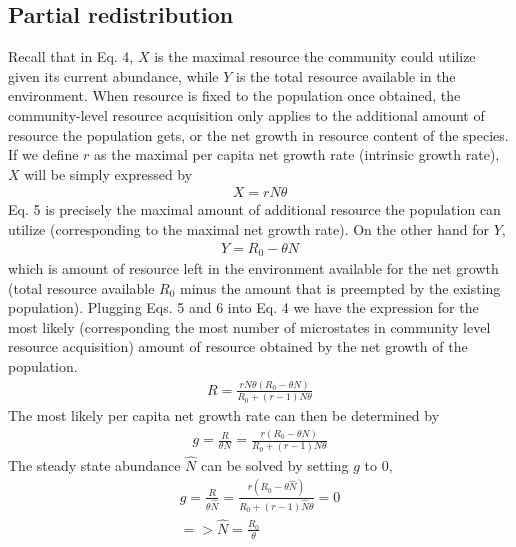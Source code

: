 \documentclass[12pt]{article}
\begin{document}
\subsection{Partial redistribution}
Recall that in Eq. 4, $X$ is the maximal resource the community could utilize given its current abundance, while $Y$ is the total resource available in the environment. When resource is fixed to the population once obtained, the community-level resource acquisition only applies to the additional amount of resource the population gets, or the net growth in resource content of the species. If we define $r$ as the maximal per capita net growth rate (intrinsic growth rate), $X$ will be simply expressed by
  \begin{equation}
 \begin{split}
X = r N \theta 
\end{split}
\end{equation}
Eq. 5 is precisely the maximal amount of additional resource the population can utilize (corresponding to the maximal net growth rate). On the other hand for $Y$,
  \begin{equation}
 \begin{split}
Y = R_0 - \theta N
\end{split}
\end{equation}
which is amount of resource left in the environment available for the net growth (total resource available $R_0$ minus the amount that is preempted by the existing population). Plugging Eqs. 5 and 6 into Eq. 4 we have the expression for the most likely (corresponding the most number of microstates in community level resource acquisition) amount of resource obtained by the net growth of the population.
  \begin{equation}
 \begin{split}
R = \frac{r N \theta (R_0 - \theta N)}{R_0 + (r-1) N \theta}
\end{split}
\end{equation}
The most likely per capita net growth rate can then be determined by
  \begin{equation}
 \begin{split}
g = \frac{R}{\theta N} = \frac{r (R_0 - \theta N)}{R_0 + (r-1) N \theta}
\end{split}
\end{equation}
The steady state abundance $\hat{N}$ can be solved by setting $g$ to 0,
  \begin{equation}
 \begin{split}
 \hat{g} = \frac{R}{\theta \hat {N}} = \frac{r (R_0 - \theta \hat {N})}{R_0 + (r-1) \hat {N} \theta} = 0\\
=> \hat {N} = \frac{R_0}{\theta } 
\end{split}
\end{equation}
\end{document}
